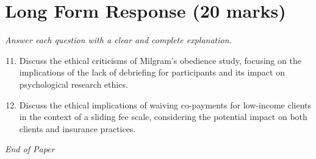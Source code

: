 \documentclass[12pt]{article}
\begin{document}
\section*{Long Form Response (20 marks)}
\textit{Answer each question with a clear and complete explanation.}
\begin{enumerate}[label=\arabic*.]
\setcounter{enumi}{10}
\item Discuss the ethical criticisms of Milgram's obedience study, focusing on the implications of the lack of debriefing for participants and its impact on psychological research ethics.
\item Discuss the ethical implications of waiving co-payments for low-income clients in the context of a sliding fee scale, considering the potential impact on both clients and insurance practices.
\end{enumerate}

\vfill
\noindent\textit{End of Paper}
\end{document}
